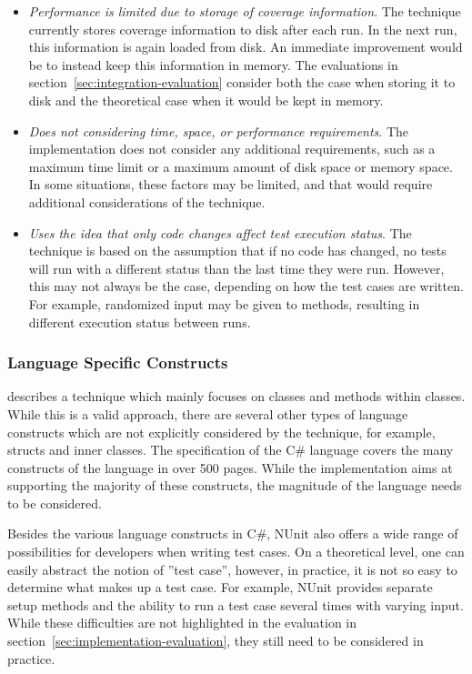 \documentclass[a4paper,english,12pt]{report}
\begin{document}
\begin{itemize}
  \item\textit{Performance is limited due to storage of coverage information}. The technique currently stores coverage information to disk after each run. In the next run, this information is again loaded from disk. An immediate improvement would be to instead keep this information in memory. The evaluations in section~\ref{sec:integration-evaluation} consider both the case when storing it to disk and the theoretical case when it would be kept in memory.
  \item\textit{Does not considering time, space, or performance requirements}. The implementation does not consider any additional requirements, such as a maximum time limit or a maximum amount of disk space or memory space. In some situations, these factors may be limited, and that would require additional considerations of the technique.
  \item\textit{Uses the idea that only code changes affect test execution status}. The technique is based on the assumption that if no code has changed, no tests will run with a different status than the last time they were run. However, this may not always be the case, depending on how the test cases are written. For example, randomized input may be given to methods, resulting in different execution status between runs.
\end{itemize}

\subsubsection{Language Specific Constructs}
\citet{mansour2009regression} describes a technique which mainly focuses on classes and methods within classes. While this is a valid approach, there are several other types of language constructs which are not explicitly considered by the technique, for example, structs and inner classes. The specification of the C\# language \citep{microsoft2013language} covers the many constructs of the language in over 500 pages. While the implementation aims at supporting the majority of these constructs, the magnitude of the language needs to be considered.

Besides the various language constructs in C\#, NUnit also offers a wide range of possibilities for developers when writing test cases. On a theoretical level, one can easily abstract the notion of ''test case'', however, in practice, it is not so easy to determine what makes up a test case. For example, NUnit provides separate setup methods and the ability to run a test case several times with varying input. While these difficulties are not highlighted in the evaluation in section~\ref{sec:implementation-evaluation}, they still need to be considered in practice.
\end{document}
